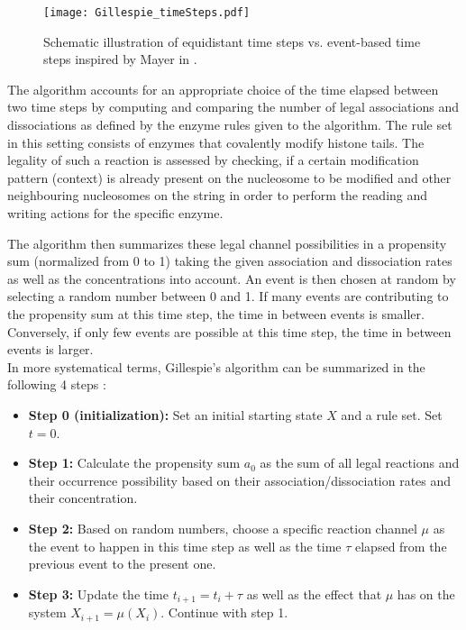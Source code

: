             \begin{figure}[htpb!]
                \centering
                \texttt{[image: Gillespie\_timeSteps.pdf]}
                \caption{Schematic illustration of equidistant time steps vs. event-based time steps inspired by Mayer in \cite{mayer2020langevin}.}
                \label{img:Gillespie_timeSteps}
            \end{figure}

            The algorithm accounts for an appropriate choice of the time elapsed between two time steps by computing and comparing the number of legal associations and dissociations as defined by the enzyme rules given to the algorithm. The rule set in this setting consists of enzymes that covalently modify histone tails. The legality of such a reaction is assessed by checking, if a certain modification pattern (context) is already present on the nucleosome to be modified and other neighbouring nucleosomes on the string in order to perform the reading and writing actions for the specific enzyme.

            The algorithm then summarizes these legal channel possibilities in a propensity sum (normalized from 0 to 1) taking the given association and dissociation rates as well as the concentrations into account. An event is then chosen at random by selecting a random number between 0 and 1. If many events are contributing to the propensity sum at this time step, the time in between events is smaller. Conversely, if only few events are possible at this time step, the time in between events is larger.\\


            In more systematical terms, Gillespie's algorithm can be summarized in the following 4 steps \cite{gillespie1977exact, mayer2020langevin}:

            \begin{itemize}
                \item \textbf{Step 0 (initialization):} Set an initial starting state $X$ and a rule set. Set $t = 0$.
                \item \textbf{Step 1:} Calculate the propensity sum $a_0$ as the sum of all legal reactions and their occurrence possibility based on their association/dissociation rates and their concentration.
                \item \textbf{Step 2:} Based on random numbers, choose a specific reaction channel $\mu$ as the event to happen in this time step as well as the time $\tau$ elapsed from the previous event to the present one.
                \item \textbf{Step 3:} Update the time $t_{i+1} = t_i + \tau$ as well as the effect that $\mu$ has on the system $X_{i+1} = \mu (X_i)$. Continue with step 1.
            \end{itemize}
